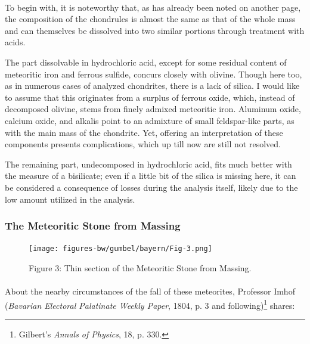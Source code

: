 \documentclass[a4paper, 12pt, oneside]{article}
\begin{document}
\paragraph*{}
To begin with, it is noteworthy that, as has already been noted on another page, the composition of the chondrules is almost the same as that of the whole mass and can themselves be dissolved into two similar portions through treatment with acids. 

The part dissolvable in hydrochloric acid, except for some residual content of meteoritic iron and ferrous sulfide, concurs closely with olivine. Though here too, as in numerous cases of analyzed chondrites, there is a lack of silica. I would like to assume that this originates from a surplus of ferrous oxide, which, instead of decomposed olivine, stems from finely admixed meteoritic iron. Aluminum oxide, calcium oxide, and alkalis point to an admixture of small feldspar-like parts, as with the main mass of the chondrite. Yet, offering an interpretation of these components presents complications, which up till now are still not resolved.

The remaining part, undecomposed in hydrochloric acid, fits much better with the measure of a bisilicate; even if a little bit of the silica is missing here, it can be considered a consequence of losses during the analysis itself, likely due to the low amount utilized in the analysis.
\clearpage
\subsubsection{The Meteoritic Stone from Massing}
\begin{figure}[h]
\centering
\texttt{[image: figures-bw/gumbel/bayern/Fig-3.png]}
\caption{Figure 3: Thin section of the Meteoritic Stone from Massing.}
\end{figure}
\paragraph*{}
About the nearby circumstances of the fall of these meteorites, Professor Imhof (\emph{Bavarian Electoral Palatinate Weekly Paper}, 1804, p. 3 and following)\footnote{Gilbert's \emph{Annals of Physics}, 18, p. 330.} shares:
\end{document}
